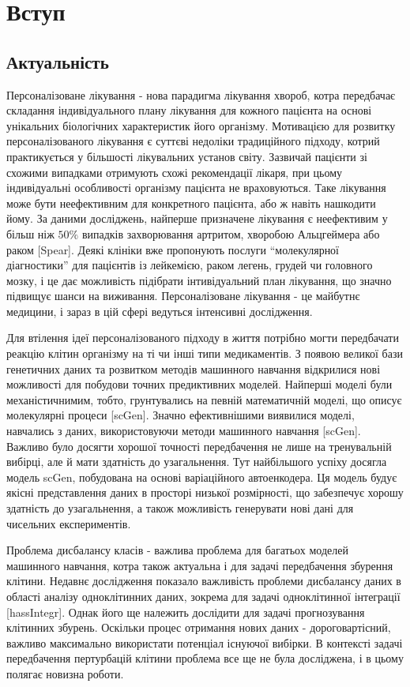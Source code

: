 \setcounter{secnumdepth}{2}
\section{Вступ}
\subsection{Актуальність}
Персоналізоване лікування - нова парадигма лікування хвороб, котра передбачає складання індивідуального плану лікування для кожного пацієнта на основі унікальних біологічних характеристик його організму. Мотивацією для розвитку персоналізованого лікування є суттєві недоліки традиційного підходу, котрий практикується у більшості лікувальних установ світу. Зазвичай пацієнти зі схожими випадками отримують схожі рекомендації лікаря, при цьому індивідуальні особливості організму пацієнта не враховуються. Таке лікування може бути неефективним для конкретного пацієнта, або ж навіть нашкодити йому. За даними досліджень, найперше призначене лікування є неефективим у більш ніж $50\%$ випадків захворювання артритом, хворобою Альцгеймера або раком [Spear]. Деякі клініки вже пропонують послуги “молекулярної діагностики” для пацієнтів із лейкемією, раком легень, грудей чи головного мозку, і це дає можливість підібрати інтивідуальний план лікування, що значно підвищує шанси на виживання. Персоналізоване лікування - це майбутнє медицини, і зараз в цій сфері ведуться інтенсивні дослідження.

Для втілення ідеї персоналізованого підходу в життя потрібно могти передбачати реакцію клітин організму на ті чи інші типи медикаментів. З появою великої бази генетичних даних та розвитком методів машинного навчання відкрилися нові можливості для побудови точних предиктивних моделей. Найперші моделі були механістичнимим, тобто, грунтувались на певній математичній моделі, що описує молекулярні процеси [scGen]. Значно ефективнішими виявилися моделі, навчались з даних, використовуючи методи машинного навчання [scGen]. Важливо було досягти хорошої точності передбачення не лише на тренувальній вибірці, але й мати здатність до узагальнення. Тут найбільшого успіху досягла модель scGen, побудована на основі варіаційного автоенкодера. Ця модель будує якісні представлення даних в просторі низької розмірності, що забезпечує хорошу здатність до узагальнення, а також можливість генерувати нові дані для чисельних експериментів.

Проблема дисбалансу класів - важлива проблема для багатьох моделей машинного навчання, котра також актуальна і для задачі передбачення збурення клітини. Недавнє дослідження показало важливість проблеми дисбалансу даних в області аналізу одноклітинних даних, зокрема для задачі одноклітинної інтеграції [hassIntegr]. Однак його ще належить дослідити для задачі прогнозування клітинних збурень. Оскільки процес отримання нових даних - дороговартісний, важливо максимально використати потенціал існуючої вибірки. В контексті задачі передбачення пертурбацій клітини проблема все ще не була досліджена, і в цьому полягає новизна роботи.

